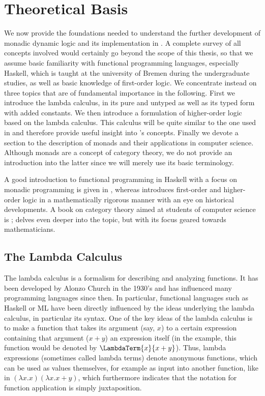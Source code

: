 
\chapter{Theoretical Basis}
\label{cha:theoret-basis}

We now provide the foundations needed to understand the further development of
monadic dynamic logic and its implementation in \IsabelleHOL. A complete survey
of all concepts involved would certainly go beyond the scope of this thesis, so
that we assume basic familiarity with functional programming languages,
especially Haskell, which is taught at the university of Bremen during the
undergraduate studies, as well as basic knowledge of first-order logic. We
concentrate instead on three topics that are of fundamental importance in the
following. First we introduce the lambda calculus, in its pure and untyped as
well as its typed form with added constants. We then introduce a formulation of
higher-order logic based on the lambda calculus. This calculus will be quite
similar to the one used in \IsabelleHOL and therefore provide useful insight
into \IsabelleHOL's concepts. Finally we devote a section to the description of
monads and their applications in computer science. Although monads are a concept
of category theory, we do not provide an introduction into the latter since we
will merely use its basic terminology. 

A good introduction to functional programming in Haskell with a focus on monadic
programming is given in \cite{Hudak00}, whereas \cite{Andrews00} introduces
first-order and higher-order logic in a mathematically rigorous manner with an
eye on historical developments. A book
on category theory aimed at students of computer science is \cite{BarrWells95};
 \cite{MacLane98} delves even deeper into the topic, but with its focus
geared towards mathematicians.


\section{The Lambda Calculus}
\label{sec:lambda-calculus}

The lambda calculus is a formalism for describing and analyzing functions. It
has been developed by Alonzo Church in the 1930's and has influenced many
programming languages since then. In particular, functional languages such as
Haskell or ML have been directly influenced by the ideas underlying the lambda
calculus, in particular its syntax. One of the key ideas of the lambda calculus
is to make a function that takes its argument (say, $x$) to a certain expression
containing that argument (\EG $x+y$) an expression itself (in the example, this
function would be denoted by $\LambdaTerm{x}{x+y}$). Thus, lambda expressions
(sometimes called lambda terms) denote anonymous functions, which can be used as
values themselves, for example as input into another function, like in $(\lambda x. x)
(\lambda x. x+y)$, which furthermore indicates that the notation for function
application is simply juxtaposition.

